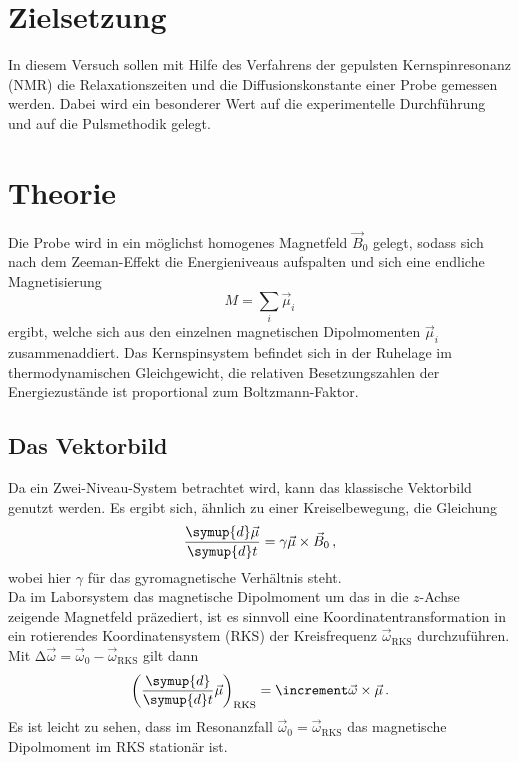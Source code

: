 \section{Zielsetzung}

    \noindent In diesem Versuch sollen mit Hilfe des Verfahrens der gepulsten Kernspinresonanz (NMR) die Relaxationszeiten und die Diffusionskonstante einer Probe gemessen werden. 
    Dabei wird ein besonderer Wert auf die experimentelle Durchführung und auf die Pulsmethodik gelegt.  


\section{Theorie}
\label{sec:theorie}

    \noindent Die Probe wird in ein möglichst homogenes Magnetfeld $\vec{B}_0$ gelegt, sodass sich nach dem Zeeman-Effekt die Energieniveaus aufspalten und sich eine endliche Magnetisierung 
    \begin{equation*}
        M = \sum_i \vec{\mu}_i
    \end{equation*}
    ergibt, welche sich aus den einzelnen magnetischen Dipolmomenten $\vec{\mu}_i$ zusammenaddiert. Das Kernspinsystem befindet sich in der Ruhelage im thermodynamischen Gleichgewicht, die relativen Besetzungszahlen 
    der Energiezustände ist proportional zum Boltzmann-Faktor.

    \subsection{Das Vektorbild}

        \noindent Da ein Zwei-Niveau-System betrachtet wird, kann das klassische Vektorbild genutzt werden. Es ergibt sich, ähnlich zu einer Kreiselbewegung, die Gleichung 
        \begin{equation*}
            \frac{\symup{d} \vec{\mu}}{\symup{d} t} = \gamma \vec{\mu} \times \vec{B}_0\, ,
        \end{equation*}
        wobei hier $\gamma$ für das gyromagnetische Verhältnis steht. \\ 

        \noindent Da im Laborsystem das magnetische Dipolmoment um das in die $z$-Achse zeigende Magnetfeld präzediert, ist es sinnvoll eine Koordinatentransformation in ein rotierendes Koordinatensystem (RKS) 
        der Kreisfrequenz $\vec{\omega}_\text{RKS}$ durchzuführen. Mit $\increment \vec{\omega} = \vec{\omega}_0 - \vec{\omega}_\text{RKS}$ gilt dann 
        \begin{equation*}
            \left(\frac{\symup{d}}{\symup{d}t} \vec{\mu}\right)_\text{RKS} = \increment \vec{\omega} \times \vec{\mu}\, .
        \end{equation*} 
        Es ist leicht zu sehen, dass im Resonanzfall $\vec{\omega}_0 = \vec{\omega}_\text{RKS}$ das magnetische Dipolmoment im RKS stationär ist. \\

